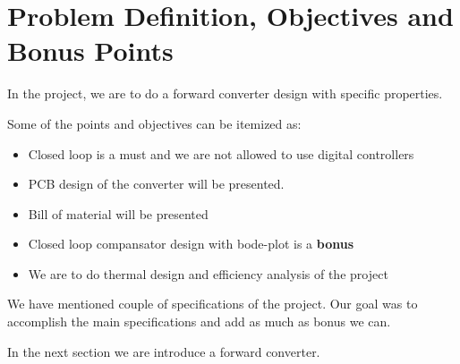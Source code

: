 \section{Problem Definition, Objectives and Bonus Points}

In the project, we are to do a forward converter design with specific properties.


\begin{table}[H]
\centering
\caption{Parameters of the project}
\label{tab:project_spec}
\end{table}

Some of the points and objectives can be itemized as:

\begin{itemize}
    \item Closed loop is a must and we are not allowed to use digital controllers
    \item PCB design of the converter will be presented.
    \item Bill of material will be presented
    \item Closed loop compansator design with bode-plot is a \textbf{bonus}
    \item We are to do thermal design and efficiency analysis of the project
\end{itemize}

We have mentioned couple of specifications of the project. Our goal was to accomplish the main specifications and add as much as bonus we can. 

In the next section we are introduce a forward converter.
